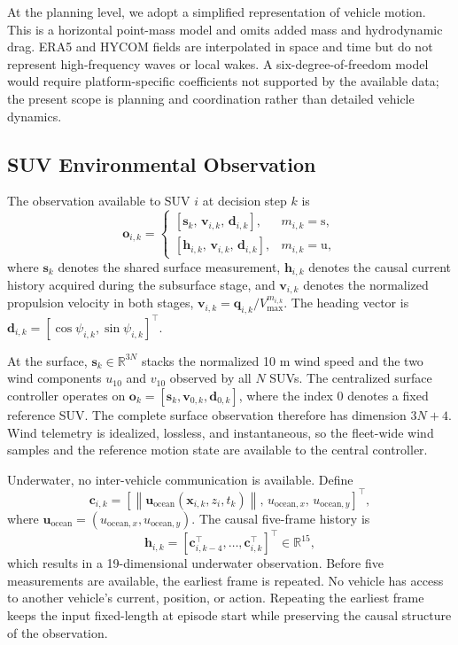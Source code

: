 \documentclass[a4paper,fleqn]{cas-dc}
\begin{document}
At the planning level, we adopt a simplified representation of vehicle motion.
This is a horizontal point-mass model and omits added mass and hydrodynamic
drag. ERA5 and HYCOM fields are interpolated in space and time but do not
represent high-frequency waves or local wakes. A six-degree-of-freedom model
would require platform-specific coefficients not supported by the available
data; the present scope is planning and coordination rather than detailed
vehicle dynamics.

\subsection{SUV Environmental Observation}
\label{subsec:handoff}

The observation available to SUV $i$ at decision step \(k\) is
\begin{equation}
\mathbf{o}_{i,k}=
\begin{cases}
\left[\mathbf{s}_{k},\,\mathbf{v}_{i,k},\,\mathbf{d}_{i,k}\right],
& m_{i,k}=\mathrm{s},\\[1mm]
\left[\mathbf{h}_{i,k},\,\mathbf{v}_{i,k},\,\mathbf{d}_{i,k}\right],
& m_{i,k}=\mathrm{u},
\end{cases}
\label{eq:observation}
\end{equation}
where $\mathbf{s}_{k}$ denotes the shared surface measurement,
$\mathbf{h}_{i,k}$ denotes the causal current history acquired during the
subsurface stage, and $\mathbf{v}_{i,k}$ denotes the normalized propulsion
velocity in both stages,
$\mathbf{v}_{i,k}=\mathbf{q}_{i,k}/V_{\max}^{m_{i,k}}$.
The heading vector is
\(\mathbf{d}_{i,k}=[\cos\psi_{i,k},\sin\psi_{i,k}]^{\top}\).

At the surface, $\mathbf{s}_{k}\in\mathbb{R}^{3N}$ stacks the normalized 10 m
wind speed and the two wind components $u_{10}$ and $v_{10}$ observed by all
$N$ SUVs. The centralized surface controller operates on
\(\mathbf{o}_{k}=[\mathbf{s}_{k},\mathbf{v}_{0,k},\mathbf{d}_{0,k}]\), where
the index \(0\) denotes a fixed reference SUV. The complete surface observation
therefore has dimension \(3N+4\). Wind telemetry is idealized, lossless, and
instantaneous, so the fleet-wide wind samples and the reference motion state
are available to the central controller.

Underwater, no inter-vehicle communication is available. Define
\[
\mathbf{c}_{i,k}
=
\left[
\left\|\mathbf{u}_{\mathrm{ocean}}(\mathbf{x}_{i,k},z_i,t_k)\right\|,\,
u_{\mathrm{ocean},x},\,u_{\mathrm{ocean},y}
\right]^{\top},
\]
where
$\mathbf{u}_{\mathrm{ocean}}=(u_{\mathrm{ocean},x},
u_{\mathrm{ocean},y})$. The causal five-frame history is
\[
\mathbf{h}_{i,k}
=
\left[\mathbf{c}_{i,k-4}^{\top},\ldots,\mathbf{c}_{i,k}^{\top}\right]^{\top}
\in\mathbb{R}^{15},
\]
which results in a 19-dimensional underwater observation. Before five measurements
are available, the earliest frame is repeated. No vehicle has access to another
vehicle's current, position, or action. Repeating the earliest frame keeps the
input fixed-length at episode start while preserving the causal structure of
the observation.
\end{document}
